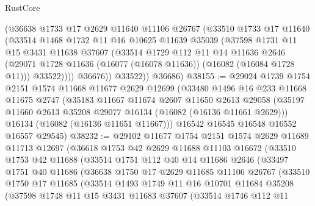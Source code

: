 \begin{lexlean}{RustCore}
\begin{coremodule}
            (@36638
              @1733
              @17
              @2629
              @11640
              @11106
              @26767
              (@33510
                @1733
                @17
                @11640
                (@33514
                  @1468
                  @1732
                  @11
                  @16
                  @10625
                  @11639
                  @35039
                  (@37598
                    @1731
                    @11
                    @15
                    @3431
                    @11638
                    @37607
                    (@33514
                      @1729
                      @112
                      @11
                      @14
                      @11636
                      @2646
                      (@29071 @1728 @11636 (@16077 (@16078 @11636)) (@16082 (@16084 @1728 @11)))
                      @33522))))
              @36676))
          @33522))
      @36686)
@38155 := @29024
    @1739
    @1754
    @2151
    @1574
    @11668
    @11677
    @2629
    @12699
    (@33480
      @1496
      @16
      @233
      @11668
      @11675
      @2747
      (@35183
        @11667
        @11674
        @2607
        @11650
        @2613
        @29058
        (@35197 @11660 @2613 @35208 @29077 @16134 (@16082 (@16136 @11661 @2629)))
        @16134
        (@16082 (@16136 @11651 @11667)))
      @16542
      @16545
      @16548
      @16552
      @16557
      @29545)
@38232 := @29102
    @11677
    @1754
    @2151
    @1574
    @2629
    @11689
    @11713
    @12697
    (@36618
      @1753
      @42
      @2629
      @11688
      @11103
      @16672
      (@33510
        @1753
        @42
        @11688
        (@33514
          @1751
          @112
          @40
          @14
          @11686
          @2646
          (@33497
            @1751
            @40
            @11686
            (@36638
              @1750
              @17
              @2629
              @11685
              @11106
              @26767
              (@33510
                @1750
                @17
                @11685
                (@33514
                  @1493
                  @1749
                  @11
                  @16
                  @10701
                  @11684
                  @35208
                  (@37598
                    @1748
                    @11
                    @15
                    @3431
                    @11683
                    @37607
                    (@33514
                      @1746
                      @112
                      @11

\end{coremodule}
\end{lexlean}

